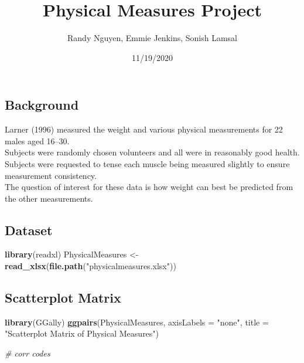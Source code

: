 \documentclass[]{article}
\title{Physical Measures Project}
\author{Randy Nguyen, Emmie Jenkins, Sonish Lamsal}
\date{11/19/2020}
\newenvironment{Shaded}{\begin{snugshade}}{\end{snugshade}}
\newcommand{\KeywordTok}[1]{\textcolor[rgb]{0.13,0.29,0.53}{\textbf{#1}}}
\newcommand{\DataTypeTok}[1]{\textcolor[rgb]{0.13,0.29,0.53}{#1}}
\newcommand{\StringTok}[1]{\textcolor[rgb]{0.31,0.60,0.02}{#1}}
\newcommand{\CommentTok}[1]{\textcolor[rgb]{0.56,0.35,0.01}{\textit{#1}}}
\newcommand{\NormalTok}[1]{#1}
\begin{document}
\maketitle

\subsection{Background}\label{background}

Larner (1996) measured the weight and various physical measurements for
22 males aged 16--30. \pause \\
Subjects were randomly chosen volunteers and all were in reasonably good
health.\\
\pause
Subjects were requested to tense each muscle being measured slightly to
ensure measurement consistency.\\
\pause
The question of interest for these data is how weight can best be
predicted from the other measurements.

\subsection{Dataset}\label{dataset}

\begin{Shaded}
\begin{Highlighting}[]
\KeywordTok{library}\NormalTok{(readxl)}
\NormalTok{PhysicalMeasures <-}\StringTok{ }\KeywordTok{read_xlsx}\NormalTok{(}\KeywordTok{file.path}\NormalTok{(}\StringTok{"physicalmeasures.xlsx"}\NormalTok{))}
\end{Highlighting}
\end{Shaded}

\subsection{Scatterplot Matrix}\label{scatterplot-matrix}

\begin{Shaded}
\begin{Highlighting}[]
\KeywordTok{library}\NormalTok{(GGally)}
\KeywordTok{ggpairs}\NormalTok{(PhysicalMeasures, }\DataTypeTok{axisLabels =} \StringTok{"none"}\NormalTok{, }
        \DataTypeTok{title =} \StringTok{"Scatterplot Matrix of Physical Measures"}\NormalTok{)}
\end{Highlighting}
\end{Shaded}

\begin{Shaded}
\begin{Highlighting}[]
\CommentTok{# corr codes}
\end{Highlighting}
\end{Shaded}
\end{document}
